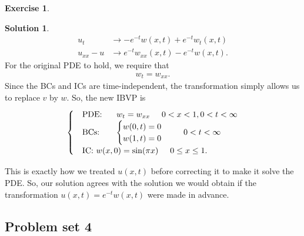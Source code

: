 \documentclass{article}
\theoremstyle{definition}
\newtheorem*{exer*}{Exercise}
\newtheorem*{sln*}{Solution}
\begin{document}
\begin{exer*}
\begin{sln*}
\begin{align*}
		u_t &\to -e^{-t}w(x,t) + e^{-t}w_t(x,t)\\
		u_{xx} - u &\to e^{-t}w_{xx}(x,t) - e^{-t}w(x,t).
		\end{align*}
		For the original PDE to hold, we require that
		\begin{align*}
		w_t = w_{xx}.
		\end{align*}
		Since the BCs and ICs are time-independent, the transformation simply allows us to replace $v$ by $w$. So, the new IBVP is
		\begin{align*}
		\begin{cases}
		&\text{PDE: }\hspace{0.5cm} w_t = w_{xx}\hspace{0.5cm} 0<x<1, 0 < t < \infty\\
		&\text{BCs: }\hspace{0.5cm} \begin{cases}
		w(0,t) = 0\\
		w(1,t) = 0
		\end{cases}\hspace{0.5cm} 0 < t < \infty\\
		&\text{IC: } w(x,0) = \sin(\pi x) \hspace{0.5cm} 0 \leq x \leq 1.
		\end{cases}
		\end{align*}
		
		This is exactly how we treated $u(x,t)$ before correcting it to make it solve the PDE. So, our solution agrees with the solution we would obtain if the transformation $u(x,t) = e^{-t}w(x,t)$ were made in advance.
		
	\end{sln*}
	
\end{exer*}


\newpage
\subsection{Problem set 4}
\end{document}
